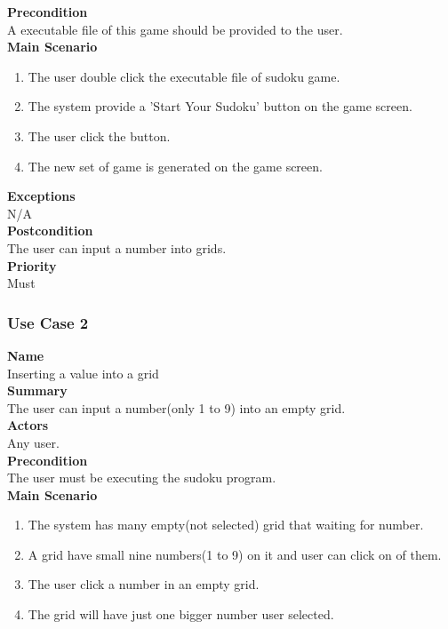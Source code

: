 \documentclass[12pt]{article}
\begin{document}
\noindent
{\bf Precondition}\\
A executable file of this game should be provided to the user.\\

\noindent
{\bf Main Scenario}\\
\vspace*{-0.2in}
\begin{enumerate}
\item 
The user double click the executable file of sudoku game.
\item
The system provide a 'Start Your Sudoku' button on the game screen.
\item
The user click the button.
\item
The new set of game is generated on the game screen.
\end{enumerate}

\noindent
{\bf Exceptions}\\
N/A \\

\noindent
{\bf Postcondition}\\
The user can input a number into grids.\\

\noindent
{\bf Priority}\\
Must \\

\noindent

\subsubsection{Use Case 2} \label{uc:2}

\noindent
{\bf Name}\\
Inserting a value into a grid\\

\noindent
{\bf Summary}\\
The user can input a number(only 1 to 9) into an empty grid.\\

\noindent
{\bf Actors}\\
Any user. \\

\noindent
{\bf Precondition}\\
The user must be executing the sudoku program.\\

\noindent
{\bf Main Scenario}\\
\vspace*{-0.2in}
\begin{enumerate}
\item 
The system has many empty(not selected) grid that waiting for number.
\item
A grid have small nine numbers(1 to 9) on it and user can click on of them.
\item
The user click a number in an empty grid.
\item
The grid will have just one bigger number user selected.
\end{enumerate}
\end{document}
